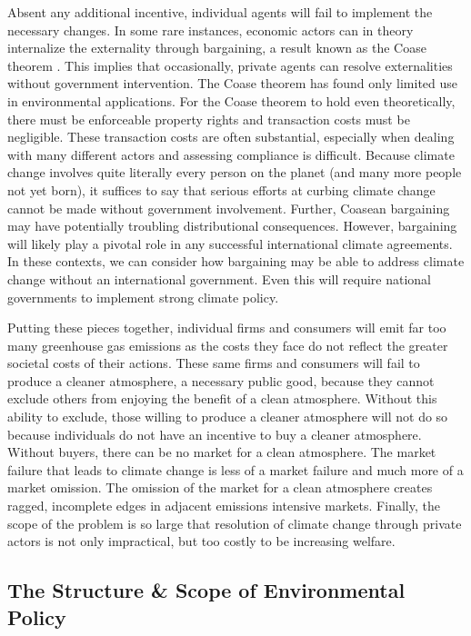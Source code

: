 Absent any additional incentive, individual agents will fail to implement the necessary changes. In some rare instances, economic actors can in theory internalize the externality through bargaining, a result known as the Coase theorem \citep{coase1960problem}. This implies that occasionally, private agents can resolve externalities without government intervention. The Coase theorem has found only limited use in environmental applications. For the Coase theorem to hold even theoretically, there must be enforceable property rights and transaction costs must be negligible. These transaction costs are often substantial, especially when dealing with many different actors and assessing compliance is difficult. Because climate change involves quite literally every person on the planet (and many more people not yet born), it suffices to say that serious efforts at curbing climate change cannot be made without government involvement. Further, Coasean bargaining may have potentially troubling distributional consequences. However, bargaining will likely play a pivotal role in any successful international climate agreements. In these contexts, we can consider how bargaining may be able to address climate change without an international government. Even this will require national governments to implement strong climate policy.

Putting these pieces together, individual firms and consumers will emit far too many greenhouse gas emissions as the costs they face do not reflect the greater societal costs of their actions. These same firms and consumers will fail to produce a cleaner atmosphere, a necessary public good, because they cannot exclude others from enjoying the benefit of a clean atmosphere. Without this ability to exclude, those willing to produce a cleaner atmosphere will not do so because individuals do not have an incentive to buy a cleaner atmosphere. Without buyers, there can be no market for a clean atmosphere. The market failure that leads to climate change is less of a market failure and much more of a market omission. The omission of the market for a clean atmosphere creates ragged, incomplete edges in adjacent emissions intensive markets. Finally, the scope of the problem is so large that resolution of climate change through private actors is not only impractical, but too costly to be increasing welfare.


\subsection{The Structure \& Scope of Environmental Policy}

